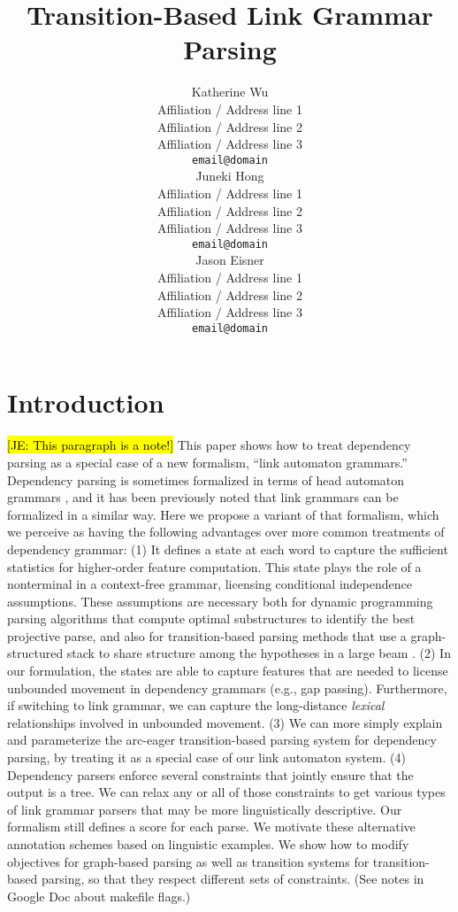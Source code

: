 \documentclass[11pt]{article}
\title{Transition-Based Link Grammar Parsing}
\author{Katherine Wu \\
  Affiliation / Address line 1 \\
  Affiliation / Address line 2 \\
  Affiliation / Address line 3 \\
  {\tt email@domain} \\\And
  Juneki Hong \\
  Affiliation / Address line 1 \\
  Affiliation / Address line 2 \\
  Affiliation / Address line 3 \\
  {\tt email@domain} \\\And
  Jason Eisner \\
  Affiliation / Address line 1 \\
  Affiliation / Address line 2 \\
  Affiliation / Address line 3 \\
  {\tt email@domain} \\
  }
\date{}
\newcommand{\Note}[1]{}
\renewcommand{\Note}[1]{\hl{[#1]}}  %
\newcommand{\NoteSigned}[3]{{\sethlcolor{#2}\Note{#1: #3}}}
\newcommand{\NoteJE}[1]{\NoteSigned{JE}{LightBlue}{#1}}
\begin{document}
\maketitle
\begin{abstract}


\end{abstract}

\section{Introduction}

\NoteJE{This paragraph is a note!} This paper shows how to treat
dependency parsing as a special case of a new formalism, ``link
automaton grammars.''  Dependency parsing is sometimes formalized in
terms of head automaton grammars \cite{alshawi,eisner}, and it has
been previously noted \cite{eisner-2000} that link grammars can be
formalized in a similar way.  Here we propose a variant of that
formalism, which we perceive as having the following advantages over
more common treatments of dependency grammar: (1) It defines a state
at each word to capture the sufficient statistics for higher-order
feature computation.  This state plays the role of a nonterminal in a
context-free grammar, licensing conditional independence assumptions.
These assumptions are necessary both for dynamic programming parsing
algorithms that compute optimal substructures to identify the best
projective parse, and also for transition-based parsing methods that
use a graph-structured stack to share structure among the hypotheses
in a large beam \cite{!!!}.  (2) In our formulation, the states are
able to capture features that are needed to license unbounded movement
in dependency grammars (e.g., gap passing).  Furthermore, if switching
to link grammar, we can capture the long-distance {\em lexical}
relationships involved in unbounded movement.  (3) We can more simply
explain and parameterize the arc-eager transition-based parsing system
for dependency parsing, by treating it as a special case of our link
automaton system.  (4) Dependency parsers enforce several constraints
that jointly ensure that the output is a tree.  We can relax any or
all of those constraints to get various types of link grammar parsers
that may be more linguistically descriptive.  Our formalism still
defines a score for each parse.  We motivate these alternative
annotation schemes based on linguistic examples.  We show how to
modify objectives for graph-based parsing as well as transition
systems for transition-based parsing, so that they respect different
sets of constraints.  (See notes in Google Doc about makefile flags.)
\end{document}
